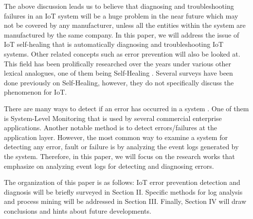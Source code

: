 The above discussion leads us to believe that diagnosing and troubleshooting failures in an IoT system will be a huge problem in the near future which may not be covered by any manufacturer, unless all the entities within the system are manufactured by the same company. In this paper, we will address the issue of IoT self-healing that is automatically diagnosing and troubleshooting IoT systems. Other related concepts such as error prevention will also be looked at. This field has been prolifically researched over the years under various other lexical analogues, one of them being Self-Healing \cite{Asghar2018,Chandraratne2017,Khalil2018}. Several surveys have been done previously on Self-Healing\cite{Asghar2018,Psaier2011,Hudaib2017,Ghosh2007}, however, they do not specifically discuss the phenomenon for IoT.

There are many ways to detect if an error has occurred in a system \cite{Silva2008}. One of them is System-Level Monitoring that is used by several commercial enterprise applications. Another notable method is to detect errors/failures at the application layer. However, the most common way to examine a system for detecting any error, fault or failure is by analyzing the event logs generated by the system. Therefore, in this paper, we will focus on the research works that emphasize on analyzing event logs for detecting and diagnosing errors.	

The organization of this paper is as follows: IoT error prevention detection and diagnosis will be briefly surveyed in Section II. Specific methods for log analysis and process mining will be addressed in Section III. Finally, Section IV will draw conclusions and hints about future developments.
